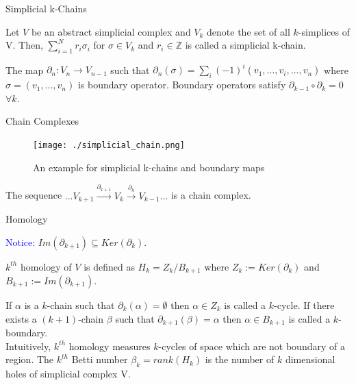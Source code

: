 \documentclass{beamer}
\begin{document}
\begin{frame}{Simplicial k-Chains}
    \begin{definition}     
        Let $V$ be an abstract simplicial complex and $V_k$ denote the set of all $k$-simplices of V. Then, $\sum\limits_{i=1}^Nr_i\sigma_i$ for $\sigma \in V_k$ and $r_i \in \mathbb{Z}$ is called a \textcolor{myred}{simplicial k-chain}.\\
    \end{definition}
    \vspace{0.5cm}
    The map $\partial_n: V_n \rightarrow V_{n-1}$ such that 
    $\partial_n(\sigma) = \sum\limits_{i}(-1)^i(v_1,...,\hat{v_i},...,v_n)$
    where $\sigma = (v_1,...,v_n)$ is \textcolor{myred}{boundary operator}. Boundary operators satisfy $\partial_{k-1}\circ \partial_{k}=0$  $\forall k$.\\
\end{frame}
\begin{frame}{Chain Complexes}
    \begin{figure}
        \texttt{[image: ./simplicial\_chain.png]}
        \caption{An example for simplicial k-chains and boundary maps \cite{hatcher}}
    \end{figure}
    \begin{definition}
        The sequence $...V_{k+1} \xrightarrow{\partial_{k+1}} V_k \xrightarrow{\partial_{k}} V_{k-1}...$ is a \textcolor{myred}{chain complex}.
    \end{definition}
\end{frame}

\begin{frame}{Homology}
    
    \textcolor{blue}{Notice:} $Im(\partial_{k+1})\subseteq Ker(\partial_{k})$.
    \vspace{0.5cm}
    \begin{definition}
        \textcolor{myred}{$k^{th}$ homology} of $V$ is defined as $H_k = Z_k/B_{k+1}$ where $Z_k:=Ker(\partial_k)$ and $B_{k+1}:=Im(\partial_{k+1})$. \\
        \end{definition}
    \vspace{0.5cm}
    If $\alpha$ is a $k$-chain such that $\partial_k(\alpha) = \emptyset$ then $\alpha \in Z_k$ is called a \textcolor{myred}{$k$-cycle}. If there exists a $(k+1)$-chain $\beta$ such that $\partial_{k+1}(\beta)=\alpha$ then $\alpha \in B_{k+1}$ is called a \textcolor{myred}{$k$-boundary}. \\
    \vspace{0.5cm}
    Intuitively, $k^{th}$ homology measures $k$-cycles of space which are not boundary of a region. The \textcolor{myred}{$k^{th}$ Betti number} $\beta_k=rank(H_k)$ is the number of $k$ dimensional holes of simplicial complex V.
\end{frame}
\end{document}

